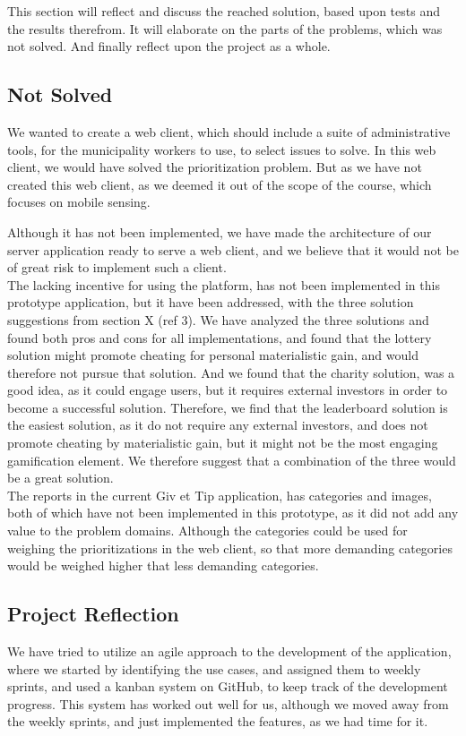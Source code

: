 This section will reflect and discuss the reached solution, based upon tests and the results therefrom. It will elaborate on the parts of the problems, which was not solved. And finally reflect upon the project as a whole.

\subsection{Not Solved}
We wanted to create a web client, which should include a suite of administrative tools, for the municipality workers to use, to select issues to solve. In this web client, we would have solved the prioritization problem. But as we have not created this web client, as we deemed it out of the scope of the course, which focuses on mobile sensing.

Although it has not been implemented, we have made the architecture of our server application ready to serve a web client, and we believe that it would not be of great risk to implement such a client.
~\\

The lacking incentive for using the platform, has not been implemented in this prototype application, but it have been addressed, with the three solution suggestions from section X (ref 3). We have analyzed the three solutions and found both pros and cons for all implementations, and found that the lottery solution might promote cheating for personal materialistic gain, and would therefore not pursue that solution. And we found that the charity solution, was a good idea, as it could engage users, but it requires external investors in order to become a successful solution. Therefore, we find that the leaderboard solution is the easiest solution, as it do not require any external investors, and does not promote cheating by materialistic gain, but it might not be the most engaging gamification element. We therefore suggest that a combination of the three would be a great solution.
~\\

The reports in the current Giv et Tip application, has categories and images, both of which have not been implemented in this prototype, as it did not add any value to the problem domains. Although the categories could be used for weighing the prioritizations in the web client, so that more demanding categories would be weighed higher that less demanding categories.

\subsection{Project Reflection}
We have tried to utilize an agile approach to the development of the application, where we started by identifying the use cases, and assigned them to weekly sprints, and used a kanban system on GitHub, to keep track of the development progress. This system has worked out well for us, although we moved away from the weekly sprints, and just implemented the features, as we had time for it.
~\\

